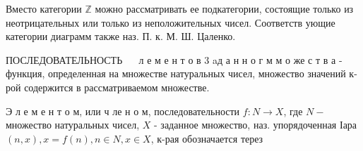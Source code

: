 \documentclass[10pt]{article}
\begin{document}
Вместо категории $\mathbb{Z}$ можно рассматривать ее подкатегории, состоящие только из неотрицательных или только из неположительных чисел. Соответств ующие категории диаграмм также наз. П. к. М. Ш. Цаленко.



ПОСЛЕДОВАТЕЛЬНОСТЬ $\quad$ л е м е н т о в 3 aд а н н о г м м о же с т в а - функция, определенная на множестве натуральных чисел, множество значений к-рой содержится в рассматриваемом множестве.



Э л е м е н т о м, или ч ле н о м, последовательности $f: N \rightarrow X$, где $N-$ множество натуральных чисел, $X$ - заданное множество, наз. упорядоченная Іара $(n, x), x=f(n), n \in N, x \in X$, к-рая обозначается терез
\end{document}
